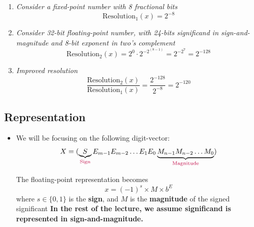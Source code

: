 \documentclass[12pt,openany, tikz,border=10pt]{book}
\begin{document}
			      	
			      	\begin{enumerate}
			      		
			      		\item \textit{Consider a fixed-point number with 8 fractional bits}
			      		      \begin{equation*}
			      		      	\text{Resolution}_1(x) = 2^{-8}
			      		      \end{equation*}
			      		          
			      		\item \textit{Consider 32-bit floating-point number, with 24-bits significand in sign-and-magnitude and 8-bit exponent in two's complement}
			      		      \begin{equation*}
			      		      	\text{Resolution}_2(x) = 2^0 \cdot 2^{-2^(8-1)} = 2^{-2^7} = 2^{-128}
			      		      \end{equation*}
			      		          
			      		\item \textit{Improved resolution}
			      		      \begin{equation*}
			      		      	\frac{\text{Resolution}_2(x)}{\text{Resolution}_1(x)} = \frac{2^{-128}}{2^{-8}} = 2^{-120}
			      		      \end{equation*}
			      	\end{enumerate}
			      	
			      	
			      	    
			      	\subsection{Representation}
			      	\begin{itemize}
			      		\item[] We will be focusing on the following digit-vector:
			      		      \[
			      		      	X = (\underbrace{S}_{\text{\color{purple}Sign}}E_{m-1}E_{m-2}\dots E_1E_0\underbrace{M_{n-1}M_{n-2}\dots M_0}_{\text{\color{purple}Magnitude}})
			      		      \]
			      		      
			      		      
			      		      The floating-point representation becomes
			      		      \[
			      		      	x = (-1)^s \times M \times b^E
			      		      \]
			      		      where \( s \in \{0, 1\} \) is the \textbf{sign}, and \( M \) is the \textbf{magnitude} of the signed significant
			      		      \vskip 0.5cm
			      		      \textbf{In the rest of the lecture, we assume significand is represented in sign-and-magnitude.}
			      	\end{itemize}
			      	
\end{document}
